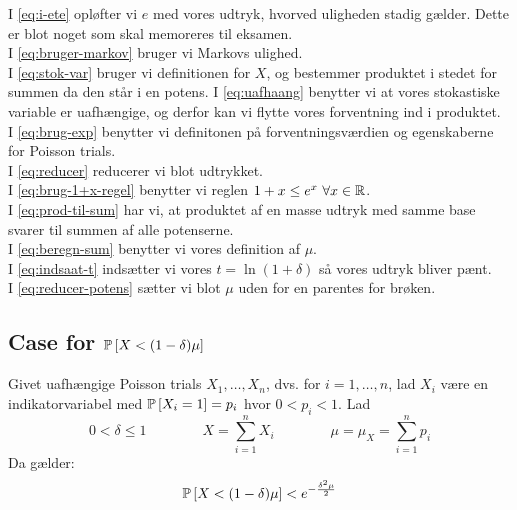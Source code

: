 I \cref{eq:i-ete} opløfter vi $e$ med vores udtryk, hvorved uligheden stadig gælder. Dette er blot noget som skal memoreres til eksamen.\\
I \cref{eq:bruger-markov} bruger vi Markovs ulighed.\\
I \cref{eq:stok-var} bruger vi definitionen for $X$, og bestemmer produktet i stedet for summen da den står i en potens.
I \cref{eq:uafhaang} benytter vi at vores stokastiske variable er uafhængige, og derfor kan vi flytte vores forventning ind i produktet.\\
I \cref{eq:brug-exp} benytter vi definitonen på forventningsværdien og egenskaberne for Poisson trials.\\
I \cref{eq:reducer} reducerer vi blot udtrykket.\\
I \cref{eq:brug-1+x-regel} benytter vi reglen $1 + x \leq e^x \ \forall x \in \R$.\\
I \cref{eq:prod-til-sum} har vi, at produktet af en masse udtryk med samme base svarer til summen af alle potenserne.\\
I \cref{eq:beregn-sum} benytter vi vores definition af $\mu$.\\
I \cref{eq:indsaat-t} indsætter vi vores $t = \ln(1 + \delta)$ så vores udtryk bliver pænt.\\
I \cref{eq:reducer-potens} sætter vi blot $\mu$ uden for en parentes for brøken.



\subsection{Case for $\P{X < (1 - \delta) \mu}$}
Givet uafhængige Poisson trials $X_1, \dots, X_n$, dvs. for $i = 1, \dots, n$, lad $X_i$ være en indikatorvariabel med $\P{X_i = 1} = p_i$ hvor $0 < p_i < 1$. Lad
$$
0 < \delta \leq 1
\quad\quad\quad\quad
X = \sum_{i=1}^n X_i
\quad\quad\quad\quad
\mu = \mu_X = \sum_{i=1}^n p_i
$$
Da gælder:
\begin{align*}
  \P{X < (1 - \delta) \mu} < e^{- \frac{\delta^2 \mu}{2}}
\end{align*}


